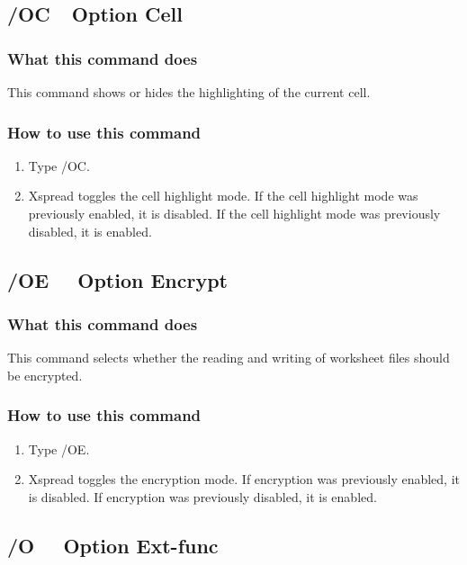         
\subsection*{/OC\ \      Option Cell}

\subsubsection*{What this command does}
This command shows or hides the highlighting of the current cell.

\subsubsection*{How to use this command}
\begin{enumerate}
\item{Type /OC.}
\item{Xspread toggles the cell highlight mode.  If the cell highlight
        mode was previously enabled, it is disabled.  If the cell
        highlight mode was previously disabled, it is enabled.}
\end{enumerate}
        
\subsection*{/OE \ \     Option Encrypt}

\subsubsection*{What this command does}
This command selects whether the reading and writing of worksheet 
files should be encrypted.

\subsubsection*{How to use this command}
\begin{enumerate}
\item{Type /OE.}
\item{Xspread toggles the encryption mode.  If encryption was previously
        enabled, it is disabled.  If encryption was previously disabled,
        it is enabled.}
\end{enumerate}
        
\subsection*{/O \ \      Option Ext-func}

